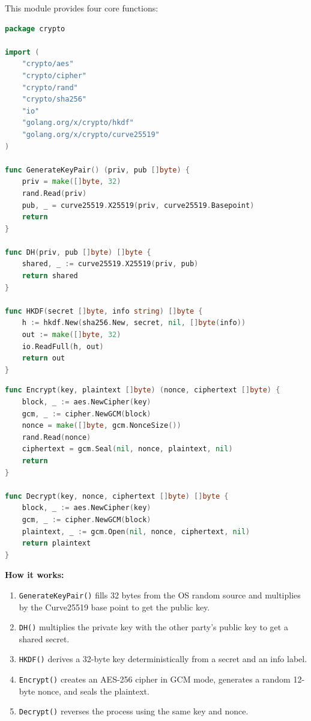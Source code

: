 \documentclass[12pt,a4paper]{article}
\begin{document}
This module provides four core functions:

\begin{lstlisting}[language=Go, caption={Crypto module -- key generation, DH, and HKDF.}]
package crypto

import (
    "crypto/aes"
    "crypto/cipher"
    "crypto/rand"
    "crypto/sha256"
    "io"
    "golang.org/x/crypto/hkdf"
    "golang.org/x/crypto/curve25519"
)

func GenerateKeyPair() (priv, pub []byte) {
    priv = make([]byte, 32)
    rand.Read(priv)
    pub, _ = curve25519.X25519(priv, curve25519.Basepoint)
    return
}

func DH(priv, pub []byte) []byte {
    shared, _ := curve25519.X25519(priv, pub)
    return shared
}

func HKDF(secret []byte, info string) []byte {
    h := hkdf.New(sha256.New, secret, nil, []byte(info))
    out := make([]byte, 32)
    io.ReadFull(h, out)
    return out
}
\end{lstlisting}

\begin{lstlisting}[language=Go, caption={Crypto module -- AES-256-GCM encrypt/decrypt.}]
func Encrypt(key, plaintext []byte) (nonce, ciphertext []byte) {
    block, _ := aes.NewCipher(key)
    gcm, _ := cipher.NewGCM(block)
    nonce = make([]byte, gcm.NonceSize())
    rand.Read(nonce)
    ciphertext = gcm.Seal(nil, nonce, plaintext, nil)
    return
}

func Decrypt(key, nonce, ciphertext []byte) []byte {
    block, _ := aes.NewCipher(key)
    gcm, _ := cipher.NewGCM(block)
    plaintext, _ := gcm.Open(nil, nonce, ciphertext, nil)
    return plaintext
}
\end{lstlisting}

\textbf{How it works:}
\begin{enumerate}
    \item \texttt{GenerateKeyPair()} fills 32 bytes from the OS random source and multiplies by the Curve25519 base point to get the public key.
    \item \texttt{DH()} multiplies the private key with the other party's public key to get a shared secret.
    \item \texttt{HKDF()} derives a 32-byte key deterministically from a secret and an info label.
    \item \texttt{Encrypt()} creates an AES-256 cipher in GCM mode, generates a random 12-byte nonce, and seals the plaintext.
    \item \texttt{Decrypt()} reverses the process using the same key and nonce.
\end{enumerate}
\end{document}
